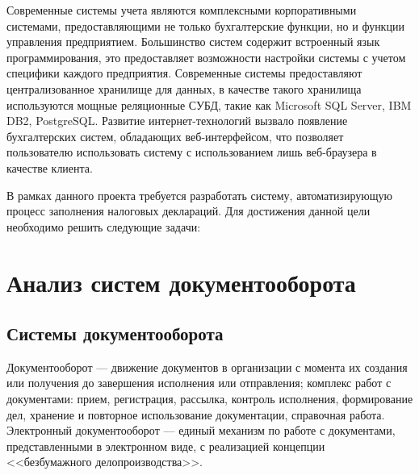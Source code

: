 \documentclass[14pt,a4paper]{reportmod}
\begin{document}
Современные системы учета являются комплексными корпоративными системами, предоставляющими не только бухгалтерские функции, но и функции управления предприятием. Большинство систем содержит встроенный язык программирования, это предоставляет возможности настройки системы с учетом специфики каждого предприятия. Современные системы предоставляют централизованное хранилище для данных, в качестве такого хранилища используются мощные реляционные СУБД, такие как Microsoft SQL Server, IBM DB2, PostgreSQL. Развитие интернет-технологий вызвало появление бухгалтерских систем, обладающих веб-интерфейсом, что позволяет пользователю использовать систему с использованием лишь веб-браузера в качестве клиента.

В рамках данного проекта требуется разработать систему, автоматизирующую процесс заполнения налоговых деклараций. Для достижения данной цели необходимо решить следующие задачи:
\begin{gostitemize}
\end{gostitemize}

\chapter{Анализ систем документооборота}

\section{Системы документооборота}
Документооборот — движение документов в организации с момента их создания или получения до завершения исполнения или отправления; комплекс работ с документами: прием, регистрация, рассылка, контроль исполнения, формирование дел, хранение и повторное использование документации, справочная работа.
Электронный документооборот  — единый механизм по работе с документами, представленными в электронном виде, с реализацией концепции <<безбумажного делопроизводства>>\cite{refwikidoc}.
\end{document}
